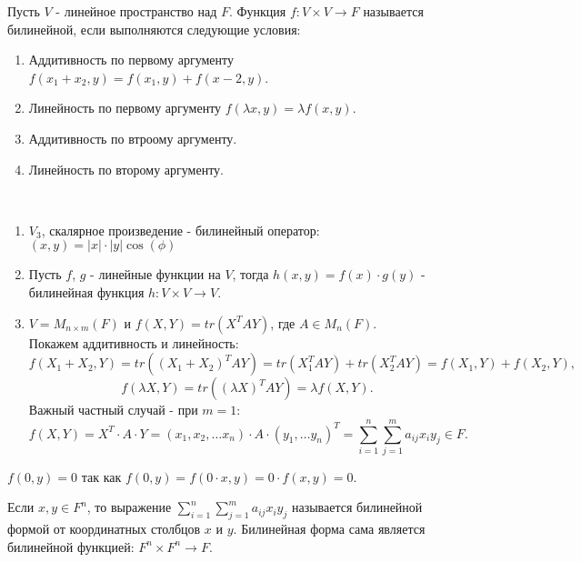 \begin{definition}
    Пусть $V$ - линейное пространство над $F$. Функция $f: V \times V \to F$ называется билинейной, если выполняются следующие условия:
    \begin{enumerate}
        \item Аддитивность по первому аргументу $f(x_1 + x_2, y) = f(x_1, y) + f(x-2, y)$.
        \item Линейность по первому аргументу $f(\lambda x, y) = \lambda f(x, y)$.
        \item Аддитивность по втроому аргументу.
        \item Линейность по второму аргументу.
    \end{enumerate}
\end{definition}

\begin{example}~
    \begin{enumerate}
        \item $V_3$, скалярное произведение - билинейный оператор: $(x, y) = |x| \cdot |y| \cos(\phi)$
        \item Пусть $f$, $g$ - линейные функции на $V$, тогда $h(x, y) = f(x) \cdot g(y)$ - билинейная функция $h: V \times V \to V$.
        \item $V = M_{n \times m}(F)$ и $f(X, Y) = tr(X^T A Y)$, где $A \in M_n(F)$. \\
        Покажем аддитивность и линейность: $$f(X_1 + X_2, Y) = tr((X_1 + X_2)^T A Y) = tr(X_1^T A Y) + tr(X_2^T A Y) = f(X_1, Y) + f(X_2, Y),$$
        $$f(\lambda X, Y) = tr((\lambda X)^T A Y) = \lambda f(X, Y).$$
        Важный частный случай - при $m=1$: $$f(X, Y) = X^T \cdot A \cdot Y = (x_1, x_2, \dots x_n) 
        \cdot A \cdot (y_1, \dots y_n)^T = \displaystyle\sum_{i=1}^{n} \displaystyle\sum_{j=1}^{m} a_{ij} x_i y_j \in F.$$
    \end{enumerate}
\end{example}

\begin{note}
    $f(0, y) = 0$ так как $f(0, y) = f(0 \cdot x, y) = 0 \cdot f(x, y) = 0$.
\end{note}

\begin{definition}
    Если $x, y \in F^n$, то выражение $\displaystyle\sum_{i=1}^{n} \displaystyle\sum_{j=1}^{m} a_{ij} x_i y_j$ называется билинейной формой от координатных столбцов $x$ и $y$. Билинейная форма сама является билинейной функцией: $F^n \times F^n \to F$.
\end{definition}

